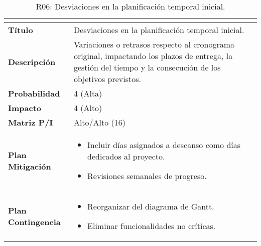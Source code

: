 \begin{table}[H]
\centering
\begin{tabular}{|>{\bfseries}l|p{10cm}|}
\hline
\rowcolor{lightgray}
\multicolumn{2}{|c|}{\textbf{Riesgo R06}} \\ \hline
Título & Desviaciones en la planificación temporal inicial. \\ \hline
Descripción & Variaciones o retrasos respecto al cronograma original, impactando los plazos de entrega, la gestión del tiempo y la consecución de los objetivos previstos. \\ \hline
Probabilidad & 4 (Alta) \cellcolor{orangerisk}\\ \hline
Impacto & 4 (Alto) \cellcolor{orangerisk}\\ \hline
Matriz P/I & Alto/Alto (16)\\ \hline
Plan Mitigación & 
\begin{itemize}
\item Incluir días asignados a descanso como días dedicados al proyecto.
\item Revisiones semanales de progreso.
\end{itemize} \\ \hline
Plan Contingencia & 
\begin{itemize}
\item Reorganizar del diagrama de Gantt.
\item Eliminar funcionalidades no críticas.
\end{itemize} \\ \hline
\end{tabular}
\caption{R06: Desviaciones en la planificación temporal inicial.}
\label{tab:R06}
\end{table}

